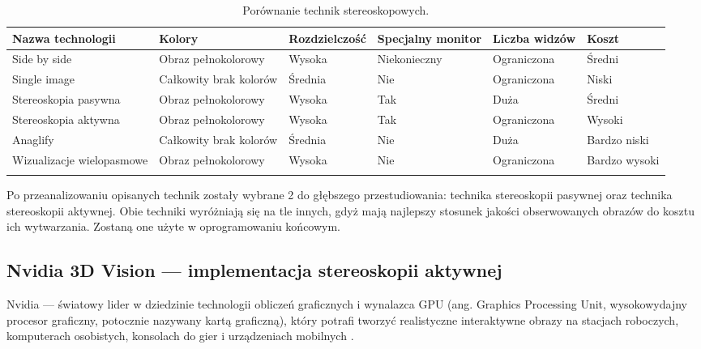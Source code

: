 \begin{table}[H]
\caption{Porównanie technik stereoskopowych.}
\centering
\footnotesize
\label{tab11}
\begin{tabular}{!{\color{sapphire}\vrule width 1pt}m{0.146\textwidth}!{\color{black}\vrule width 1pt}m{0.146\textwidth}!{\color{black}\vrule width 1pt}m{0.146\textwidth}!{\color{black}\vrule width 1pt}m{0.126\textwidth}!{\color{black}\vrule width 1pt}m{0.136\textwidth}!{\color{black}\vrule width 1pt}m{0.126\textwidth}!{\color{sapphire}\vrule width 1pt}}
	\hline
	\Centering\bfseries Nazwa technologii &
	\Centering\bfseries Kolory &
	\Centering\bfseries Rozdzielczość &
	\Centering\bfseries Specjalny monitor &
	\Centering\bfseries Liczba widzów &
	\Centering\bfseries Koszt \\
	\hline
	Side by side & Obraz pełnokolorowy & Wysoka & Niekonieczny & Ograniczona & Średni \\ 
	\hline
	Single image & Całkowity brak kolorów & Średnia & Nie & Ograniczona & Niski \\ 
	\hline
	Stereoskopia pasywna & Obraz pełnokolorowy & Wysoka & Tak & Duża & Średni \\ 
	\hline
	Stereoskopia aktywna & Obraz pełnokolorowy & Wysoka & Tak & Ograniczona & Wysoki \\ 
	\hline
	Anaglify & Całkowity brak kolorów & Średnia & Nie & Duża & Bardzo niski \\ 
	\hline
	Wizualizacje wielopasmowe & Obraz pełnokolorowy & Wysoka & Nie & Ograniczona & Bardzo wysoki \\ 
	\hline
\end{tabular}
\end{table}

Po przeanalizowaniu opisanych technik zostały wybrane 2 do głębszego przestudiowania: technika stereoskopii pasywnej oraz technika stereoskopii aktywnej. Obie techniki wyróżniają się na tle innych, gdyż mają najlepszy stosunek jakości obserwowanych obrazów do kosztu ich wytwarzania. Zostaną one użyte w oprogramowaniu końcowym.


\subsection{Nvidia 3D Vision --- implementacja stereoskopii aktywnej}
Nvidia --- światowy lider w dziedzinie technologii obliczeń graficznych i wynalazca GPU (ang. Graphics Processing Unit, wysokowydajny procesor graficzny, potocznie nazywany kartą graficzną), który potrafi tworzyć realistyczne interaktywne obrazy na stacjach roboczych, komputerach osobistych, konsolach do gier i urządzeniach mobilnych \cite{NvidiaInfo}. 

